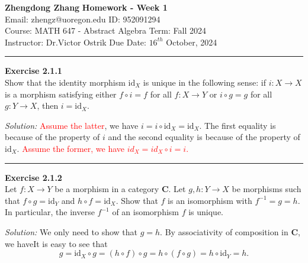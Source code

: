 \documentclass[a4paper, 12pt]{article}
\newenvironment{problem}[2][Exercise]
    { \begin{mdframed}[backgroundcolor=gray!20] \textbf{#1 #2} \\}
    {  \end{mdframed}}
\newenvironment{solution}
    {\textit{Solution:}}
    {}
\begin{document}
\noindent
\large\textbf{Zhengdong Zhang} \hfill \textbf{Homework - Week 1}   \\
Email: zhengz@uoregon.edu \hfill ID: 952091294 \\
\normalsize Course: MATH 647 - Abstract Algebra  \hfill Term: Fall 2024\\
Instructor: Dr.Victor Ostrik \hfill Due Date: $16^{th}$ October, 2024 \\
\noindent\rule{7in}{2.8pt}
\begin{problem}{2.1.1}
Show that the identity morphism \(\text{id}_X\) is unique in the following sense: if \(i:X\rightarrow X\) is a morphism satisfying either \(f\circ i=f\) for all \(f:X\rightarrow Y\) or \(i\circ g=g\) for all \(g:Y\rightarrow X\), then \(i=\text{id}_X\).
\end{problem}
\begin{solution}
\textcolor{red}{Assume the latter}, we have \(i=i\circ \text{id}_X=\text{id}_X\). The first equality is because of the property of \(i\) and the second equality is because of the property of \(\text{id}_X\). \textcolor{red}{Assume the former, we have \(id_X=id_X\circ i=i\).}
\end{solution}
\\ 
\noindent\rule{7in}{2.8pt}
\begin{problem}{2.1.2}
Let \(f:X\rightarrow Y\) be a morphism in a category \(\mathbf{C}\). Let \(g,h:Y\rightarrow X\) be morphisms such that \(f\circ g=\text{id}_Y\) and \(h\circ f=\text{id}_X\). Show that \(f\) is an isomorphism with \(f^{-1}=g=h\). In particular, the inverse \(f^{-1}\) of an isomorphism \(f\) is unique.
\end{problem}
\begin{solution}
We only need to show that \(g=h\). By associativity of composition in \(\mathbf{C}\), we haveIt is easy to see that 
$$g=\text{id}_X\circ g=(h\circ f)\circ g=h\circ (f\circ g)=h\circ \text{id}_Y=h.$$
\end{solution}
\end{document}
